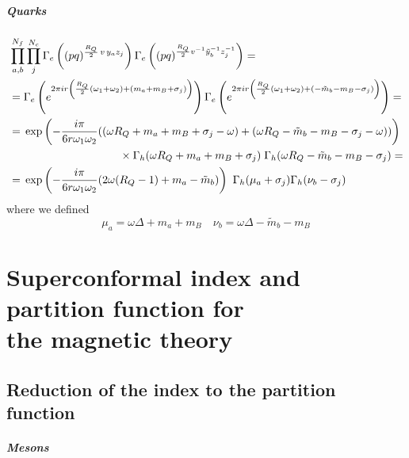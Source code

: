 \begin{appendices}
\paragraph{Quarks}
\begin{equation}
\begin{aligned}
&\prod_{a,b}^{N_f} \prod_{j}^{N_c}
\Gamma_e\left(
(pq)^{\frac{R_Q}{2} \, v \,  y_a z_j }\right) 
\Gamma_e\left(
(pq)^{\frac{R_Q}{2} v^{-1} \tilde y_b^{-1} z_j^{-1} } \right)  = \\
& =
\Gamma_e\left( e^{2 \pi i  r  \left( {R_Q \over 2} (\omega_1 + \omega_2)  + ( m_a + m_B + \sigma_j) \right) } \right )
\Gamma_e\left( e^{2 \pi i r  \left( {R_Q \over 2} (\omega_1 + \omega_2) + ( -\tilde{m}_b - m_B - \sigma_j) \right) } \right) = \\
& =   \,\exp \left( {- \frac{i \pi} {6 r \omega_1 \omega_2 }  ( ( \omega R_Q + m_a + m_B + \sigma_j -  \omega) + ( \omega R_Q -\tilde{m}_b - m_B - \sigma_j -  \omega))} \right) \\
& \qquad  \qquad \qquad \qquad \qquad  \times \Gamma_h ( \omega R_Q + m_a + m_B + \sigma_j) \; \Gamma_h ( \omega R_Q - \tilde{m}_b - m_B - \sigma_j) = \\
& =\, \exp \left( {- \frac{i \pi} {6 r \omega_1 \omega_2 }  ( 2 \omega (R_Q - 1) + m_a - \tilde{m}_b )} \right)  \, \, \Gamma_h ( \mu_a + \sigma_j) \Gamma_h ( \nu_b - \sigma_j)
\end{aligned}
\end{equation}
where we defined
\begin{equation}
 \mu_a = \omega \Delta + m_a + m_B  \quad  \nu_b = \omega \Delta - \tilde m_b - m_B
\end{equation}


\chapter{Superconformal index and \\
partition function for
\\ the magnetic theory}
\label{appendix:magnetic_theory_calculations}
\section{Reduction of the index to the partition function}
\paragraph{Mesons}


\end{appendices}
